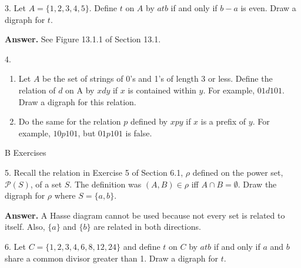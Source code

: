 \documentclass[10pt,]{book}
\theoremstyle{plain}
\theoremstyle{definition}
\theoremstyle{definition}
\theoremstyle{definition}
\theoremstyle{definition}
\begin{document}
\begin{exercisegroup}
\item[3.]\hypertarget{exercise-9}{}  Let \(A=\{1,2,3,4,5\}\). Define \(t\) on \(A\) by \(a t b\) if and only if \(b - a\) is even. Draw a digraph for \(t\).%
\par\smallskip
\par\smallskip
\noindent\textbf{Answer.}\hypertarget{answer-5}{}\quad
 See Figure 13.1.1 of Section 13.1.%
\item[4.]\hypertarget{exercise-10}{}\leavevmode%
\begin{enumerate}[label=\alph*]
\item\hypertarget{li-21}{}Let \(A\) be the set of strings of 0's and 1's of length 3 or less. Define the relation of \(d\) on A by \(x d y\) if \(x\) is contained within \(y\). For example, \(01 d 101\). Draw a digraph for this relation. %
\item\hypertarget{li-22}{} Do the same for the relation \(p\) defined by \(x p y\) if \(x\) is a prefix of \(y\). For example, \(10 p 101\), but \(01 p 101\) is false.%
\end{enumerate}
%
\par\smallskip
\end{exercisegroup}
\par\smallskip\noindent
\hypertarget{exercisegroup-4}{}\typeout{************************************************}
\typeout{************************************************}
B Exercises%
\begin{exercisegroup}
\item[5.]\hypertarget{exercise-11}{} Recall the relation in Exercise 5 of Section 6.1, \(\rho\) defined on the power set, \(\mathcal{P}(S)\), of a set \(S\). The definition
was \((A,B) \in \rho\) iff \(A\cap  B = \emptyset\). Draw the digraph for \(\rho\) where \(S = \{a, b\}\). %
\par\smallskip
\par\smallskip
\noindent\textbf{Answer.}\hypertarget{answer-6}{}\quad
 A Hasse diagram cannot be used because not every set is related to itself. Also, \(\{a\}\) and \(\{b\}\) are related in both directions.
%
\item[6.]\hypertarget{exercise-12}{} Let \(C= \{1,2, 3, 4, 6, 8, 12, 24\}\) and define \(t\) on \(C\) by
\(a t b\) if and only if \(a\) and \(b\) share a common divisor greater than 1.  Draw a digraph for \(t\).%
\par\smallskip
\end{exercisegroup}
\par\smallskip\noindent
\typeout{************************************************}
\typeout{************************************************}
\end{document}
